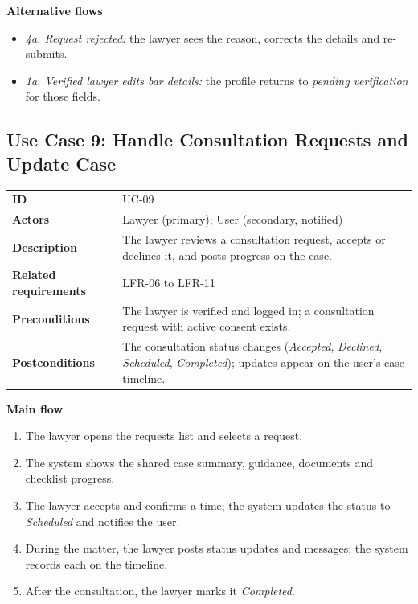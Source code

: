 \textbf{Alternative flows}

\begin{itemize}
  \item \emph{4a. Request rejected:} the lawyer sees the reason, corrects the details and re-submits.
  \item \emph{1a. Verified lawyer edits bar details:} the profile returns to \emph{pending verification} for those fields.
\end{itemize}

\subsection{Use Case 9: Handle Consultation Requests and Update Case}

\begin{center}
\begin{tabular}{|L{2.85cm}|L{12.08cm}|}
\hline\headrow {} &  \\ \hline
\textbf{ID} & UC-09 \\ \hline
\textbf{Actors} & Lawyer (primary); User (secondary, notified) \\ \hline
\textbf{Description} & The lawyer reviews a consultation request, accepts or declines it, and posts progress on the case. \\ \hline
\textbf{Related requirements} & LFR-06 to LFR-11 \\ \hline
\textbf{Preconditions} & The lawyer is verified and logged in; a consultation request with active consent exists. \\ \hline
\textbf{Postconditions} & The consultation status changes (\emph{Accepted}, \emph{Declined}, \emph{Scheduled}, \emph{Completed}); updates appear on the user's case timeline. \\ \hline
\end{tabular}
\end{center}

\textbf{Main flow}

\begin{enumerate}
  \item The lawyer opens the requests list and selects a request.
  \item The system shows the shared case summary, guidance, documents and checklist progress.
  \item The lawyer accepts and confirms a time; the system updates the status to \emph{Scheduled} and notifies the user.
  \item During the matter, the lawyer posts status updates and messages; the system records each on the timeline.
  \item After the consultation, the lawyer marks it \emph{Completed}.
\end{enumerate}


